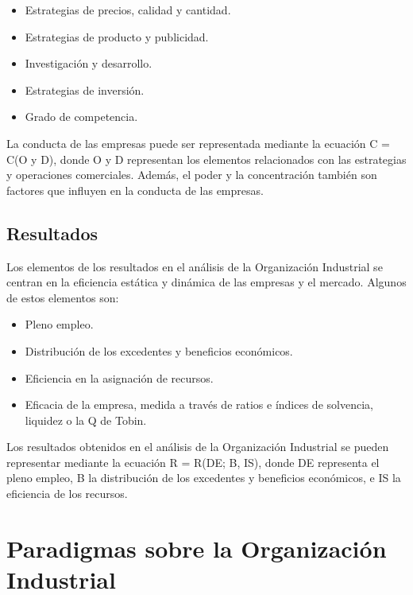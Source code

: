 \documentclass[
  letterpaper,
  DIV=11,
  numbers=noendperiod]{scrartcl}
\providecommand{\tightlist}{%
  \setlength{\itemsep}{0pt}\setlength{\parskip}{0pt}}\usepackage{longtable,booktabs,array}
\begin{document}
\begin{itemize}
\tightlist
\item
  Estrategias de precios, calidad y cantidad.
\item
  Estrategias de producto y publicidad.
\item
  Investigación y desarrollo.
\item
  Estrategias de inversión.
\item
  Grado de competencia.
\end{itemize}

La conducta de las empresas puede ser representada mediante la ecuación
C = C(O y D), donde O y D representan los elementos relacionados con las
estrategias y operaciones comerciales. Además, el poder y la
concentración también son factores que influyen en la conducta de las
empresas.

\hypertarget{resultados}{%
\subsection{Resultados}\label{resultados}}

Los elementos de los resultados en el análisis de la Organización
Industrial se centran en la eficiencia estática y dinámica de las
empresas y el mercado. Algunos de estos elementos son:

\begin{itemize}
\tightlist
\item
  Pleno empleo.
\item
  Distribución de los excedentes y beneficios económicos.
\item
  Eficiencia en la asignación de recursos.
\item
  Eficacia de la empresa, medida a través de ratios e índices de
  solvencia, liquidez o la Q de Tobin.
\end{itemize}

Los resultados obtenidos en el análisis de la Organización Industrial se
pueden representar mediante la ecuación R = R(DE; B, IS), donde DE
representa el pleno empleo, B la distribución de los excedentes y
beneficios económicos, e IS la eficiencia de los recursos.

\hypertarget{paradigmas-sobre-la-organizaciuxf3n-industrial}{%
\section{Paradigmas sobre la Organización
Industrial}\label{paradigmas-sobre-la-organizaciuxf3n-industrial}}
\end{document}
